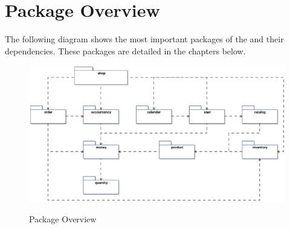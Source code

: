 \section{Package Overview}
The following diagram shows the most important packages of the \salespoint and their dependencies. These packages are detailed in the chapters below.

\begin{figure}[ht]
	\centering
  \includegraphics[width=1.0\textwidth]{images/Package_Overview.eps}
	\label{package_overview}
	\caption{Package Overview}
\end{figure}